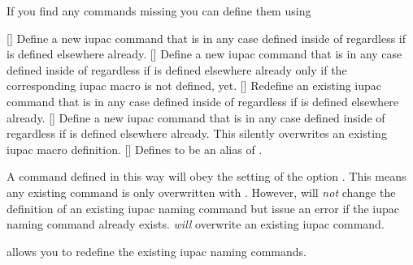 \documentclass{chemmacros-manual}
\begin{document}
If you find any commands missing you can define them using
\begin{commands}
  []
    Define a new \ac{iupac} command that is in any case defined inside of
     regardless if  is defined elsewhere already.
  []
    Define a new \ac{iupac} command that is in any case defined inside of
     regardless if  is defined elsewhere already only if
    the corresponding \ac{iupac} macro is not defined, yet.
  []
    Redefine an existing \ac{iupac} command that is in any case defined inside
    of  regardless if  is defined elsewhere already.
  []
    Define a new \ac{iupac} command that is in any case defined inside of
     regardless if  is defined elsewhere already.  This
    silently overwrites an existing \ac{iupac} macro definition.
  []
    Defines  to be an alias of .
\end{commands}
A command defined in this way will obey the setting of the option
.  This means any existing command is only overwritten with
.  However,  will \emph{not} change the
definition of an existing \ac{iupac} naming command but issue an error if the
\ac{iupac} naming command already exists.   \emph{will}
overwrite an existing \ac{iupac} command.
\begin{example}
  \NewChemIUPAC{}
  \RenewChemIUPAC{}
\end{example}

 allows you to redefine the existing \ac{iupac} naming
commands.
\begin{example}
   \par
  \RenewChemIUPAC{}
\end{example}
\end{document}
